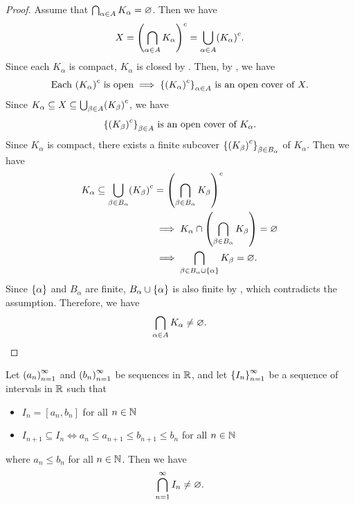 \begin{proof}
    Assume that $\bigcap_{\alpha \in A} K_{\alpha} = \vnot$. Then we have
    \[
    X = \paren*{\bigcap_{\alpha \in A} K_{\alpha}}^{c} = \bigcup_{\alpha \in A} \paren*{K_{\alpha}}^{c}.
    \]
    Since each $K_{\alpha}$ is compact, $K_{\alpha}$ is closed by .
    Then, by , we have
    \[
    \text{Each } \paren*{K_{\alpha}}^{c} \text{ is open} \implies
    \set*{\paren*{K_{\alpha}}^{c}}_{\alpha \in A} \text{ is an open cover of } X.
    \]
    Since $K_{\alpha} \subseteq X \subseteq \bigcup_{\beta \in A} \paren*{K_{\beta}}^{c}$, we have
    \[
    \set*{\paren*{K_{\beta}}^{c}}_{\beta \in A} \text{ is an open cover of } K_{\alpha}.
    \]
    Since $K_{\alpha}$ is compact, there exists a finite subcover
    $\set*{\paren*{K_{\beta}}^{c}}_{\beta \in B_{\alpha}}$ of $K_{\alpha}$. Then we have
    \begin{align*}
        K_{\alpha} \subseteq \bigcup_{\beta \in B_{\alpha}} \paren*{K_{\beta}}^{c}
        &= \paren*{\bigcap_{\beta \in B_{\alpha}} K_{\beta}}^{c} \\
        &\implies K_{\alpha} \cap \paren*{\bigcap_{\beta \in B_{\alpha}} K_{\beta}} = \vnot \\
        &\implies \bigcap_{\beta \in B_{\alpha} \cup \set*{\alpha}} K_{\beta} = \vnot.
    \end{align*}
    Since $\set*{\alpha}$ and $B_{\alpha}$ are finite, $B_{\alpha} \cup \set*{\alpha}$ is also finite
    by , which contradicts the assumption. Therefore, we have
    \[
    \bigcap_{\alpha \in A} K_{\alpha} \neq \vnot.
    \]
\end{proof}

\bigskip

\begin{lemma} \label{an:lem:nested-intervals}
    Let $\paren*{a_{n}}_{n = 1}^{\infty}$ and $\paren*{b_{n}}_{n = 1}^{\infty}$ be sequences in $\R$,
    and let $\set*{I_{n}}_{n = 1}^{\infty}$ be a sequence of intervals in $\R$ such that
    \begin{itemize}
        \item $I_{n} = [a_{n}, b_{n}]$ for all $n \in \N$
        \item $I_{n + 1} \subseteq I_{n} \iff a_{n} \leq a_{n + 1} \leq b_{n + 1} \leq b_{n}$ for all $n \in \N$
    \end{itemize}
    where $a_{n} \leq b_{n}$ for all $n \in \N$. Then we have
    \[
    \bigcap_{n = 1}^{\infty} I_{n} \neq \vnot.
    \]
\end{lemma}

